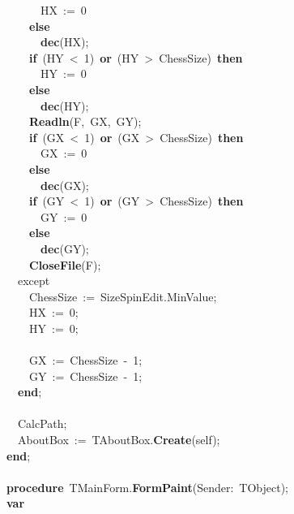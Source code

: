 \mbox{}\ \ \ \ \ \ HX\ :=\ 0 \\
\mbox{}\ \ \ \ \textbf{else} \\
\mbox{}\ \ \ \ \ \ \textbf{dec}(HX); \\
\mbox{}\ \ \ \ \textbf{if}\ (HY\ \textless{}\ 1)\ \textbf{or}\ (HY\ \textgreater{}\ ChessSize)\ \textbf{then} \\
\mbox{}\ \ \ \ \ \ HY\ :=\ 0 \\
\mbox{}\ \ \ \ \textbf{else} \\
\mbox{}\ \ \ \ \ \ \textbf{dec}(HY); \\
\mbox{}\ \ \ \ \textbf{Readln}(F,\ GX,\ GY); \\
\mbox{}\ \ \ \ \textbf{if}\ (GX\ \textless{}\ 1)\ \textbf{or}\ (GX\ \textgreater{}\ ChessSize)\ \textbf{then} \\
\mbox{}\ \ \ \ \ \ GX\ :=\ 0 \\
\mbox{}\ \ \ \ \textbf{else} \\
\mbox{}\ \ \ \ \ \ \textbf{dec}(GX); \\
\mbox{}\ \ \ \ \textbf{if}\ (GY\ \textless{}\ 1)\ \textbf{or}\ (GY\ \textgreater{}\ ChessSize)\ \textbf{then} \\
\mbox{}\ \ \ \ \ \ GY\ :=\ 0 \\
\mbox{}\ \ \ \ \textbf{else} \\
\mbox{}\ \ \ \ \ \ \textbf{dec}(GY); \\
\mbox{}\ \ \ \ \textbf{CloseFile}(F); \\
\mbox{}\ \ except \\
\mbox{}\ \ \ \ ChessSize\ :=\ SizeSpinEdit.MinValue; \\
\mbox{}\ \ \ \ HX\ :=\ 0; \\
\mbox{}\ \ \ \ HY\ :=\ 0; \\
\mbox{} \\
\mbox{}\ \ \ \ GX\ :=\ ChessSize\ -\ 1; \\
\mbox{}\ \ \ \ GY\ :=\ ChessSize\ -\ 1; \\
\mbox{}\ \ \textbf{end}; \\
\mbox{} \\
\mbox{}\ \ CalcPath; \\
\mbox{}\ \ AboutBox\ :=\ TAboutBox.\textbf{Create}(self); \\
\mbox{}\textbf{end}; \\
\mbox{} \\
\mbox{}\textbf{procedure}\ TMainForm.\textbf{FormPaint}(Sender:\ TObject); \\
\mbox{}\textbf{var} \\
